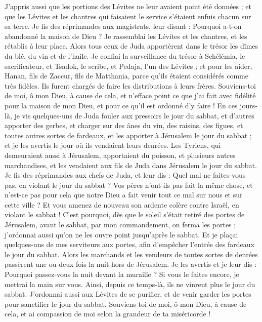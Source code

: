 \begin{multicols}{2}
J'appris aussi que les portions des Lévites ne leur avaient point été données ; et que les Lévites et les chantres qui faisaient le service s'étaient enfuis chacun sur sa terre.
Je fis des réprimandes aux magistrats, leur disant : Pourquoi a-t-on abandonné la maison de Dieu ? Je rassemblai les Lévites et les chantres, et les rétablis à leur place.
Alors tous ceux de Juda apportèrent dans le trésor les dîmes du blé, du vin et de l'huile.
Je confiai la surveillance du trésor à Schélémia,  le sacrificateur, et Tsadok, le scribe, et Pedaja, l’un des Lévites ; et pour les aider, Hanan, fils de Zaccur, fils de Matthania, parce qu'ils étaient considérés comme très fidèles. Ils furent chargés de faire les distributions à leurs frères.
Souviens-toi de moi, ô mon Dieu, à cause de cela, et n'efface point ce que j'ai fait avec fidélité pour la maison de mon Dieu, et pour ce qu'il est ordonné d'y faire !
En ces jours-là, je vis quelques-uns de Juda fouler aux pressoirs le jour du sabbat, et d'autres apporter des gerbes, et charger sur des ânes du vin, des raisins, des figues, et toutes autres sortes de fardeaux, et les apporter à Jérusalem le jour du sabbat ; et je les avertis le jour où ils vendaient leurs denrées.
Les Tyriens, qui demeuraient aussi à Jérusalem, apportaient du poisson, et plusieurs autres marchandises, et les vendaient aux fils de Juda dans Jérusalem le jour du sabbat.
Je fis des réprimandes aux chefs de Juda, et leur dis : Quel mal ne faites-vous pas, en violant le jour du sabbat ?
Vos pères n'ont-ils pas fait la même chose, et n'est-ce pas pour cela que notre Dieu a fait venir tout ce mal sur nous et sur cette ville ? Et vous amenez de nouveau son ardente colère contre Israël, en violant le sabbat !
C'est pourquoi, dès que le soleil s'était retiré des portes de Jérusalem, avant le sabbat, par mon commandement, on ferma les portes ; j’ordonnai aussi qu'on ne les ouvre point jusqu'après le sabbat. Et je plaçai quelques-uns de mes serviteurs aux portes, afin d’empêcher l'entrée des fardeaux le jour du sabbat.
Alors les marchands et les vendeurs de toutes sortes de denrées passèrent une ou deux fois la nuit hors de Jérusalem.
Je les avertis et je leur dis : Pourquoi passez-vous la nuit devant la muraille ? Si vous le faites encore, je mettrai la main sur vous. Ainsi, depuis ce temps-là, ils ne vinrent plus le jour du sabbat.
J’ordonnai aussi aux Lévites de se purifier, et de venir garder les portes pour sanctifier le jour du sabbat. Souviens-toi de moi, ô mon Dieu, à cause de cela, et ai compassion de moi selon la grandeur de ta miséricorde !

\end{multicols}

